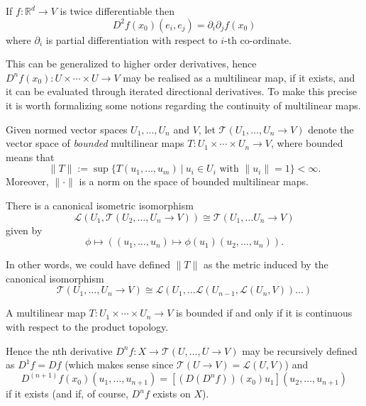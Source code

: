 \documentclass[twoside, a4paper, 10pt]{amsart}
\begin{document}
\begin{lemma}\label{lemma: second derivative is iterated derivative} If $f: \mathbb{R}^d \to V$ is twice differentiable then $$ D^2 f (x_0) (e_i, e_j) = \partial_i \partial_j f(x_0)$$ where $\partial_i$ is partial differentiation with respect to $i$-th co-ordinate. \end{lemma}

This can be generalized to higher order derivatives, hence $D^n f(x_0) : U \times \cdots \times U \to V$ may be realised as a multilinear map, if it exists, and it can be evaluated through iterated directional derivatives. To make this precise it is worth formalizing some notions regarding the continuity of multilinear maps.

\begin{mydef} Given normed vector spaces $U_1, \ldots, U_n$ and $V$, let $\mathcal{T}(U_1, \ldots, U_n \to V)$ denote the vector space of \textit{bounded} multilinear maps $T: U_1 \times \cdots \times U_n \to V$, where bounded means that $$\| T \| := \sup \{ T(u_1, \ldots, u_m) ~|~ u_i \in U_i \text{ with } \|u_i \| = 1 \} < \infty.$$ Moreover, $\| \cdot \|$ is a norm on the space of bounded multilinear maps.  \end{mydef}

\begin{prop} There is a canonical isometric isomorphism $$ \mathcal{L}(U_1, \mathcal{T}(U_2, \ldots, U_n \to V)) \cong \mathcal{T}(U_1, \ldots U_n \to V)$$ given by $$\phi \mapsto ((u_1, \ldots, u_n) \mapsto \phi(u_1)(u_2, \ldots, u_n)).$$  \end{prop}

In other words, we could have defined $\| T \|$ as the metric induced by the canonical isomorphism $$ \mathcal{T}(U_1, \ldots, U_n \to V) \cong  \mathcal{L}(U_1, \ldots \mathcal{L}(U_{n-1}, \mathcal{L}(U_n,V)) \ldots) $$

\begin{prop} A multilinear map $T: U_1 \times \cdots \times U_n \to V$ is bounded if and only if it is continuous with respect to the product topology. \end{prop}

Hence the nth derivative $D^nf : X \to \mathcal{T}(U, \ldots, U \to V)$ may be recursively defined as $D^1f = Df$ (which makes sense since $\mathcal{T}(U \to V) = \mathcal{L}(U, V)$) and $$D^{(n+1)}f (x_0)(u_1, \ldots, u_{n+1}) = [(D(D^nf))(x_0)u_1] (u_2, \ldots, u_{n+1})$$ if it exists (and if, of course, $D^nf$ exists on $X$). 
\end{document}

